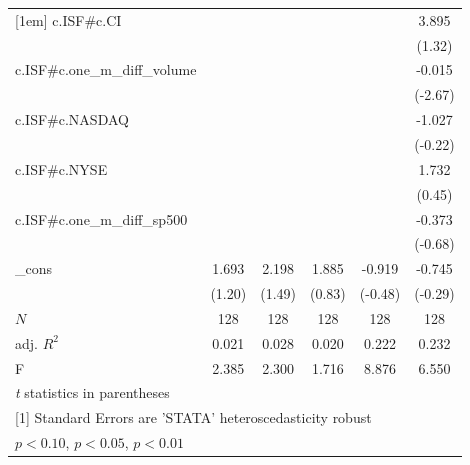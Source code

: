 \begin{table}[htbp]
\begin{tabular}{l*{5}{c}}
[1em]
c.ISF#c.CI  &                     &                     &                     &                     &       3.895         \\
            &                     &                     &                     &                     &      (1.32)         \\
[1em]
c.ISF#c.one\_m\_diff\_volume&                     &                     &                     &                     &      -0.015\sym{***}\\
            &                     &                     &                     &                     &     (-2.67)         \\
[1em]
c.ISF#c.NASDAQ&                     &                     &                     &                     &      -1.027         \\
            &                     &                     &                     &                     &     (-0.22)         \\
[1em]
c.ISF#c.NYSE&                     &                     &                     &                     &       1.732         \\
            &                     &                     &                     &                     &      (0.45)         \\
[1em]
c.ISF#c.one\_m\_diff\_sp500&                     &                     &                     &                     &      -0.373         \\
            &                     &                     &                     &                     &     (-0.68)         \\
[1em]
\_cons      &       1.693         &       2.198         &       1.885         &      -0.919         &      -0.745         \\
            &      (1.20)         &      (1.49)         &      (0.83)         &     (-0.48)         &     (-0.29)         \\
\hline
\(N\)       &         128         &         128         &         128         &         128         &         128         \\
adj. \(R^{2}\)&       0.021         &       0.028         &       0.020         &       0.222         &       0.232         \\
F           &       2.385         &       2.300         &       1.716         &       8.876         &       6.550         \\
\hline\hline
\multicolumn{6}{l}{\footnotesize \textit{t} statistics in parentheses}\\
\multicolumn{6}{l}{\footnotesize [1] Standard Errors are 'STATA' heteroscedasticity robust}\\
\multicolumn{6}{l}{\footnotesize \sym{*} \(p<0.10\), \sym{**} \(p<0.05\), \sym{***} \(p<0.01\)}\\
\end{tabular}
\end{table}
